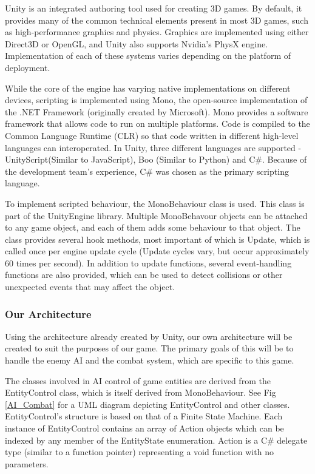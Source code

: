 \documentclass{article}
\begin{document}
Unity is an integrated authoring tool used for creating 3D games.  By default, it provides many of the common technical elements present in most 3D games, such as high-performance graphics and physics.  Graphics are implemented using either Direct3D or OpenGL, and Unity also supports Nvidia's PhysX engine.  Implementation of each of these systems varies depending on the platform of deployment.

While the core of the engine has varying native implementations on different devices, scripting is implemented using Mono, the open-source implementation of the .NET Framework (originally created by Microsoft).  Mono provides a software framework that allows code to run on multiple platforms.  Code is compiled to the Common Language Runtime (CLR) so that code written in different high-level languages can interoperated.  In Unity, three different languages are supported - UnityScript(Similar to JavaScript), Boo (Similar to Python) and C\#.  Because of the development team's experience, C\# was chosen as the primary scripting language.

To implement scripted behaviour, the MonoBehaviour class is used.  This class is part of the UnityEngine library.  Multiple MonoBehavour objects can be attached to any game object, and each of them adds some behaviour to that object.  The class provides several hook methods, most important of which is Update, which is called once per engine update cycle (Update cycles vary, but occur approximately 60 times per second).  In addition to update functions, several event-handling functions are also provided, which can be used to detect collisions or other unexpected events that may affect the object.

\subsubsection{Our Architecture}

Using the architecture already created by Unity, our own architecture will be created to suit the purposes of our game.  The primary goals of this will be to handle the enemy AI and the combat system, which are specific to this game.

The classes involved in AI control of game entities are derived from the EntityControl class, which is itself derived from MonoBehaviour.  See Fig \ref{AI_Combat} for a UML diagram depicting EntityControl and other classes.  EntityControl's structure is based on that of a Finite State Machine.  Each instance of EntityControl contains an array of Action objects which can be indexed by any member of the EntityState enumeration.  Action is a C\# delegate type (similar to a function pointer) representing a void function with no parameters.
\end{document}
